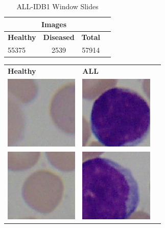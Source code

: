 \documentclass[
	a4paper,
	10pt,
	unnumberedsections,
	twoside,
]{research_article}
\begin{document}
\begin{tabular}{c}
\end{tabular}

\newpage
\begin{table}[ht]
	\caption{ALL-IDB1 Window Slides}
	\centering
	\label{tab:datasets}
	\begin{tabular}{lccc}
		\multicolumn{3}{c}{Images} \\
		\hline
		\textbf{Healthy} & \textbf{Diseased} & \textbf{Total} \\
		\hline
		55375 & 2539 & 57914 \\
		\hline
	\end{tabular}
\end{table}
\begin{tabular}{m{3.25cm} m{4cm} m{4cm}}
	\textbf{Healthy} & \textbf{ALL} \\
	\includegraphics[width=3.5cm]{images/Im001_1_window_100.jpg} & \includegraphics[width=3.5cm]{images/Im001_1_window_219.jpg} \\
	\includegraphics[width=3.5cm]{images/Im001_1_window_196.jpg} & \includegraphics[width=3.5cm]{images/Im002_1_window_473.jpg} \\

\end{tabular}
\end{document}
